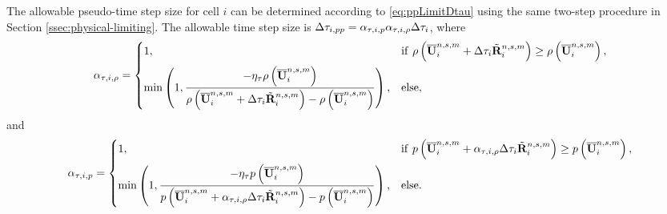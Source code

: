 The allowable pseudo-time step size for cell $i$ can be determined according to \eqref{eq:ppLimitDtau} using the same two-step procedure in Section \ref{ssec:physical-limiting}. The allowable time step size is $\mathrm\Delta \tau_{i,pp}= \alpha_{\tau,i,p}\alpha_{\tau,i,\rho} \mathrm\Delta  \tau_{i}$,
where
\begin{equation}
    \alpha_{\tau,i,\rho} = \begin{dcases}
        1,                                                                                                                                                                             & \mathrm{if} \ \rho\left(\overline{\mathbf{U}}^{n,s,m}_i + \mathrm\Delta \tau_{i} \tilde{\mathbf{R}}^{n,s,m}_i\right) \geq  \rho\left(\overline{\mathbf{U}}^{n,s,m}_i\right), \\
        \min\left(1, \dfrac{-\eta_\tau \rho\left(\overline{\mathbf{U}}^{n,s,m}_i\right)}{\rho \left(\overline{\mathbf{U}}^{n,s,m}_i + \mathrm\Delta \tau_{i} \tilde{\mathbf{R}}^{n,s,m}_i\right)-  \rho\left(\overline{\mathbf{U}}^{n,s,m}_i\right)} \right), &
        \mathrm{else},
    \end{dcases}
\end{equation}
and
\begin{equation}
    \alpha_{\tau,i,p} = \begin{dcases}
        1,                                                                                                                                                                                            & \mathrm{if} \ p \left(\overline{\mathbf{U}}^{n,s,m}_i + \alpha_{\tau,i,\rho} \mathrm\Delta \tau_{i} \tilde{\mathbf{R}}^{n,s,m}_i\right) \geq  p \left(\overline{\mathbf{U}}^{n,s,m}_i\right), \\
        \min\left(1, \dfrac{-\eta_\tau p \left(\overline{\mathbf{U}}^{n,s,m}_i\right)}{p \left(\overline{\mathbf{U}}^{n,s,m}_i +  \alpha_{\tau,i,\rho} \mathrm\Delta \tau_{i} \tilde{\mathbf{R}}^{n,s,m}_i\right)-  p \left(\overline{\mathbf{U}}^{n,s,m}_i\right)} \right), &
        \mathrm{else}.
    \end{dcases}
\end{equation}

